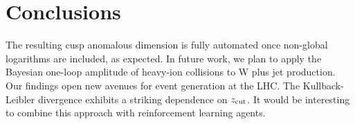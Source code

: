 \section{Conclusions}\label{sec:conclusions}

The resulting cusp anomalous dimension is fully automated once
non-global logarithms are included, as expected. In future work, we plan
to apply the Bayesian one-loop amplitude of heavy-ion collisions to W
plus jet production. Our findings open new avenues for event generation
at the LHC. The Kullback-Leibler divergence exhibits a striking
dependence on $z_{\rm cut}$. It would be interesting to combine this
approach with reinforcement learning agents.


